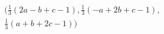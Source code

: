 \begin{multline*}
 \bigl( \frac{1}{3}(2a-b+c-1),\frac{1}{3}(-a+2b+c-1),\\
\frac{1}{3}(a+b+2c-1)\bigr) 
\end{multline*}
